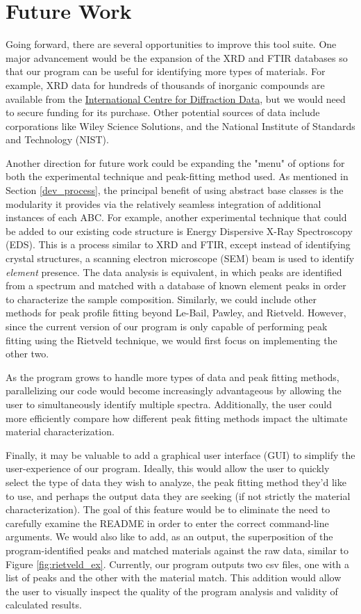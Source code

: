 \documentclass{dhbenelux}
\begin{document}
\section{Future Work} \label{future_work}

Going forward, there are several opportunities to improve this tool suite. One major advancement would be the expansion of the XRD and FTIR databases so that our program can be useful for identifying more types of materials. For example, XRD data for hundreds of thousands of inorganic compounds are available from the \href{https://www.icdd.com/}{International Centre for Diffraction Data}, but we would need to secure funding for its purchase. Other potential sources of data include corporations like Wiley Science Solutions, and the National Institute of Standards and Technology (NIST).

Another direction for future work could be expanding the "menu" of options for both the experimental technique and peak-fitting method used. As mentioned in Section \ref{dev_process}, the principal benefit of using abstract base classes is the modularity it provides via the relatively seamless integration of additional instances of each ABC. For example, another experimental technique that could be added to our existing code structure is Energy Dispersive X-Ray Spectroscopy (EDS). This is a process similar to XRD and FTIR, except instead of identifying crystal structures, a scanning electron microscope (SEM) beam is used to identify \textit{element} presence. The data analysis is equivalent, in which peaks are identified from a spectrum and matched with a database of known element peaks in order to characterize the sample composition. Similarly, we could include other methods for peak profile fitting beyond Le-Bail, Pawley, and Rietveld. However, since the current version of our program is only capable of performing peak fitting using the Rietveld technique, we would first focus on implementing the other two.

As the program grows to handle more types of data and peak fitting methods, parallelizing our code would become increasingly advantageous by allowing the user to simultaneously identify multiple spectra. Additionally, the user could more efficiently compare how different peak fitting methods impact the ultimate material characterization. 

Finally, it may be valuable to add a graphical user interface (GUI) to simplify the user-experience of our program. Ideally, this would allow the user to quickly select the type of data they wish to analyze, the peak fitting method they'd like to use, and perhaps the output data they are seeking (if not strictly the material characterization). The goal of this feature would be to eliminate the need to carefully examine the README in order to enter the correct command-line arguments. We would also like to add, as an output, the superposition of the program-identified peaks and matched materials against the raw data, similar to Figure \ref{fig:rietveld_ex}. Currently, our program outputs two csv files, one with a list of peaks and the other with the material match. This addition would allow the user to visually inspect the quality of the program analysis and validity of calculated results.  


\newpage

\end{document}
